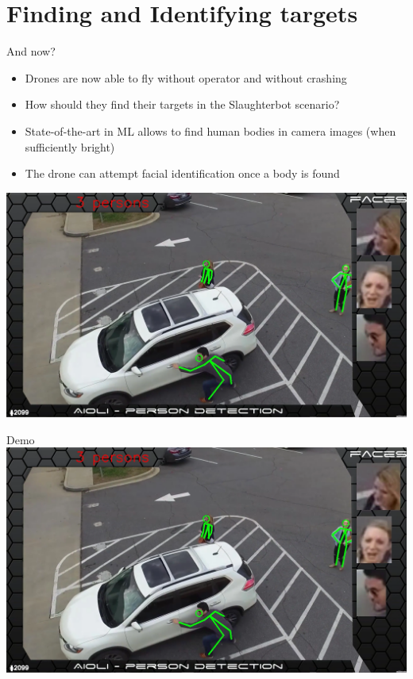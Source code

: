 \documentclass[aspectratio=169]{beamer}
\begin{document}
\section{Finding and Identifying targets}
\begin{frame}{And now?}
	\begin{itemize}
		\item Drones are now able to fly without operator and without crashing
		\item How should they find their targets in the Slaughterbot scenario?
		\item State-of-the-art in ML allows to find human bodies in camera images (when sufficiently bright)
		\item The drone can attempt facial identification once a body is found		
	\end{itemize}
	\centering
	\includegraphics[width=.55\linewidth]{images/aioli_detections.png}
\end{frame}

\begin{frame}{Demo}
\centering
            \href{run:./videos/aioli_detections.mp4?autostart}
            {\includegraphics[width=.95\linewidth]{images/aioli_detections.png}}
\end{frame}
\end{document}
